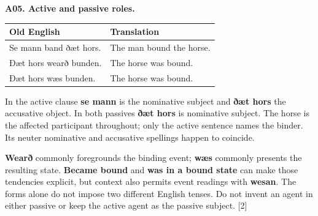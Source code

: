 \par\begin{minipage}{\linewidth}\raggedright
\textbf{A05. Active and passive roles.}

\par\begingroup
\fontsize{10.5}{13.2}\selectfont
\setlength{\LTleft}{0pt}\setlength{\LTright}{\fill}
\noindent
\begin{tabular}{@{}>{\raggedright\arraybackslash}p{54.46mm}>{\raggedright\arraybackslash}p{66.73mm}@{}}
\toprule
\textbf{Old English} & \textbf{Translation} \\
\midrule
Se mann band ðæt hors. & The man bound the horse. \\
Ðæt hors wearð bunden. & The horse was bound. \\
Ðæt hors wæs bunden. & The horse was bound. \\
\bottomrule
\end{tabular}
\par\endgroup

In the active clause \textbf{se mann} is the nominative subject and \textbf{ðæt hors} the accusative object. In both passives \textbf{ðæt hors} is nominative subject. The horse is the affected participant throughout; only the active sentence names the binder. Its neuter nominative and accusative spellings happen to coincide.

\textbf{Wearð} commonly foregrounds the binding event; \textbf{wæs} commonly presents the resulting state. \textbf{Became bound} and \textbf{was in a bound state} can make those tendencies explicit, but context also permits event readings with \textbf{wesan}. The forms alone do not impose two different English tenses. Do not invent an agent in either passive or keep the active agent as the passive subject. [2]

\end{minipage}\par\addvspace{4pt}

